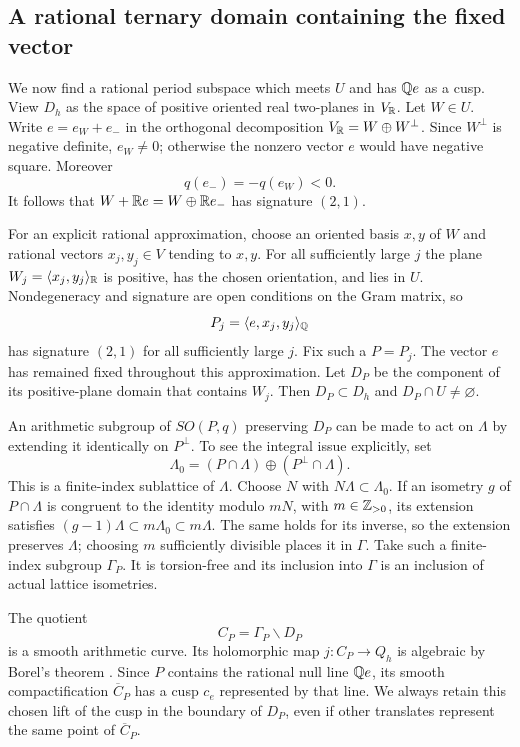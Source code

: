 \subsection{A rational ternary domain containing the fixed vector}

We now find a rational period subspace which meets $U$ and has
$\mathbb Q e$ as a cusp.  View $D_h$ as the space of positive oriented
real two-planes in
$V_{\mathbb R}$.  Let $W\in U$.  Write $e=e_W+e_-$ in the orthogonal
decomposition $V_{\mathbb R}=W\oplus W^\perp$.  Since $W^\perp$ is
negative definite, $e_W\ne0$; otherwise the nonzero vector $e$
would have negative square.  Moreover
\[
 q(e_-)=-q(e_W)<0.
\]
It follows that $W+\mathbb R e=W\oplus\mathbb R e_-$ has signature $(2,1)$.

For an explicit rational approximation, choose an oriented basis
$x,y$ of $W$ and rational vectors $x_j,y_j\in V$ tending to $x,y$.
For all sufficiently large $j$ the plane
$W_j=\langle x_j,y_j\rangle_{\mathbb R}$ is positive, has the chosen
orientation, and lies in $U$.  Nondegeneracy and signature are open
conditions on the Gram matrix, so
\[
 P_j=\langle e,x_j,y_j\rangle_{\mathbb Q}
\]
has signature $(2,1)$ for all sufficiently large $j$.  Fix such a
$P=P_j$.  The vector $e$ has remained fixed throughout this
approximation.  Let $D_P$ be the component of its
positive-plane domain that contains $W_j$.  Then $D_P\subset D_h$
and $D_P\cap U\ne\varnothing$.

An arithmetic subgroup of $SO(P,q)$ preserving $D_P$ can be made
to act on $\Lambda$ by extending it identically on $P^\perp$.
To see the integral issue explicitly, set
\[
 \Lambda_0=(P\cap\Lambda)\oplus(P^\perp\cap\Lambda).
\]
This is a finite-index sublattice of $\Lambda$.  Choose $N$ with
$N\Lambda\subset\Lambda_0$.  If an isometry $g$ of $P\cap\Lambda$
is congruent to the identity modulo $mN$, with $m\in\mathbb Z_{>0}$,
its extension satisfies
$(g-1)\Lambda\subset m\Lambda_0\subset m\Lambda$.
The same holds for its inverse, so the extension preserves
$\Lambda$; choosing $m$ sufficiently divisible places it in
$\Gamma$.  Take such a
finite-index subgroup $\Gamma_P$.  It is torsion-free and its
inclusion into $\Gamma$ is an inclusion of actual lattice
isometries.

The quotient
\[
 C_P=\Gamma_P\backslash D_P
\]
is a smooth arithmetic curve.  Its holomorphic map
$j:C_P\to Q_h$ is algebraic by Borel's theorem
\cite[Theorem~3.10]{Borel}.  Since $P$ contains
the rational null line $\mathbb Q e$, its smooth compactification
$\overline C_P$ has a cusp $c_e$ represented by that line.  We
always retain this chosen lift of the cusp in the boundary of
$D_P$, even if other translates represent the same point of
$\overline C_P$.


